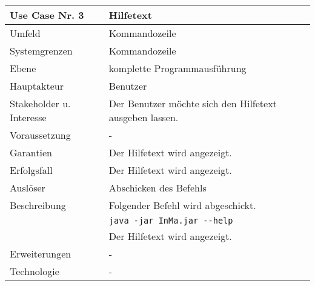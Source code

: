 \begin{tabular}{| l | l |}
 \hline
 \textbf{Use Case Nr. 3} & Hilfetext\\
 \hline
 Umfeld & Kommandozeile\\
 \hline
 Systemgrenzen & Kommandozeile\\
 \hline
 Ebene & komplette Programmausführung\\
 \hline
 Hauptakteur & Benutzer\\
 \hline
 Stakeholder u. Interesse & Der Benutzer möchte sich den Hilfetext ausgeben lassen.\\
 \hline
 Voraussetzung & -\\
 \hline
 Garantien & Der Hilfetext wird angezeigt.\\
 \hline
 Erfolgsfall & Der Hilfetext wird angezeigt.\\
 \hline
 Auslöser & Abschicken des Befehls\\
 \hline
 Beschreibung & Folgender Befehl wird abgeschickt.\\
	      & \verb|java -jar InMa.jar --help|\\
	      & Der Hilfetext wird angezeigt.\\
 \hline
 Erweiterungen & -\\
 \hline
 Technologie & -\\
 \hline
\end{tabular}


